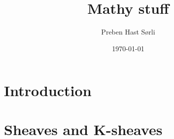 \documentclass[british,titlepage]{ntnuthesis}
\title{Mathy stuff}
\author{Preben Hast Sørli}
\date{\today}
\begin{document}
\tableofcontents

\printglossaries

\chapter{Introduction}
    
\chapter{Sheaves and K-sheaves}
    
    
\end{document}
